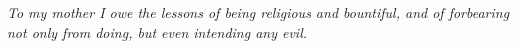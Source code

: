 \emph{To my mother I owe the lessons of being religious and bountiful, and of forbearing not only from doing, but even intending any evil.}